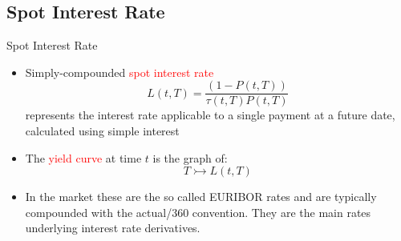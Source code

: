 \documentclass{beamer}
\begin{document}

\subsection{Spot Interest Rate}
\begin{frame}{Spot Interest Rate}
	\begin{itemize}
		\item Simply-compounded \textcolor{red}{spot interest rate}
		\begin{equation}
			L(t,T)=\frac{(1-P(t,T))}{\tau(t,T)P(t,T)}		
		\end{equation}
		represents the interest rate applicable to a single payment at a future date, calculated using simple interest
		\item The \textcolor{red}{yield curve} at time $t$ is the graph of:
		\begin{equation*}
			T\rightarrowtail L(t, T)
		\end{equation*}
		\item In the market these are the so called EURIBOR rates and are typically compounded with the actual/360 convention. They are the main rates underlying interest rate derivatives.
	\end{itemize}
\end{frame}
\end{document}
